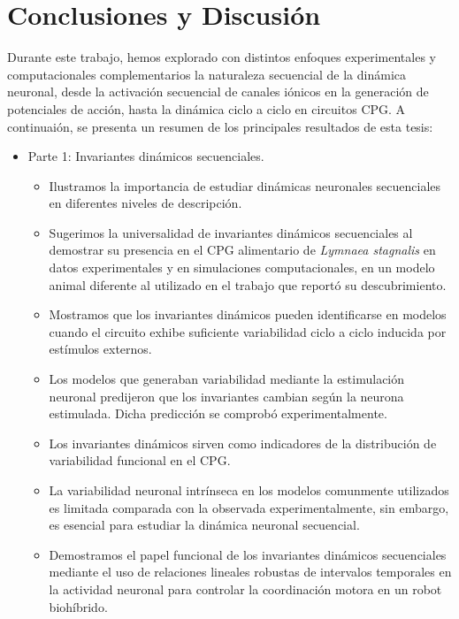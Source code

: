 \chapter{Conclusiones y Discusión} %

Durante este trabajo, hemos explorado con distintos enfoques experimentales y computacionales complementarios la naturaleza secuencial de la dinámica neuronal, desde la activación secuencial de canales iónicos en la generación de potenciales de acción, hasta la dinámica ciclo a ciclo en circuitos CPG. A continuaión, se presenta un resumen de los principales resultados de esta tesis:

\begin{itemize}
	\item Parte 1: Invariantes dinámicos secuenciales.
	\begin{itemize}
		\item Ilustramos la importancia de estudiar dinámicas neuronales secuenciales en diferentes niveles de descripción.
		\item Sugerimos la universalidad de invariantes dinámicos secuenciales al demostrar su presencia en el CPG alimentario de \textit{Lymnaea stagnalis} en datos experimentales y en simulaciones computacionales, en un modelo animal diferente al utilizado en el trabajo que reportó su descubrimiento.
		\item Mostramos que los invariantes dinámicos pueden identificarse en modelos cuando el circuito exhibe suficiente variabilidad ciclo a ciclo inducida por estímulos externos.
		\item Los modelos que generaban variabilidad mediante la estimulación neuronal predijeron que los invariantes cambian según la neurona estimulada. Dicha predicción se comprobó experimentalmente.
		\item Los invariantes dinámicos sirven como indicadores de la distribución de variabilidad funcional en el CPG.
		\item La variabilidad neuronal intrínseca en los modelos comunmente utilizados es limitada comparada con la observada experimentalmente, sin embargo, es esencial para estudiar la dinámica neuronal secuencial.
		\item Demostramos el papel funcional de los invariantes dinámicos secuenciales mediante el uso de relaciones lineales robustas de intervalos temporales en la actividad neuronal para controlar la coordinación motora en un robot biohíbrido.
	\end{itemize}
	

\end{itemize}
